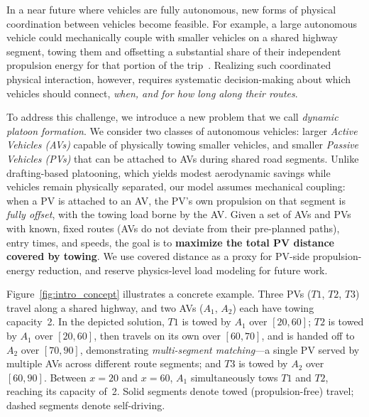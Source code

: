 \documentclass[conference]{IEEEtran}
\begin{document}

In a near future where vehicles are fully autonomous, new forms of physical coordination between vehicles become feasible. For example, a large autonomous vehicle could mechanically couple with smaller vehicles on a shared highway segment, towing them and offsetting a substantial share of their independent propulsion energy for that portion of the trip~\cite{yurtsever2020survey,shladover2009cooperative}. Realizing such coordinated physical interaction, however, requires systematic decision-making about which vehicles should connect, \emph{when, and for how long along their routes}.

To address this challenge, we introduce a new problem that we call \textit{dynamic platoon formation}. We consider two classes of autonomous vehicles: larger \textit{Active Vehicles (AVs)} capable of physically towing smaller vehicles, and smaller \textit{Passive Vehicles (PVs)} that can be attached to AVs during shared road segments. Unlike drafting-based platooning, which yields modest aerodynamic savings while vehicles remain physically separated, our model assumes mechanical coupling: when a PV is attached to an AV, the PV's own propulsion on that segment is \emph{fully offset}, with the towing load borne by the AV. Given a set of AVs and PVs with known, fixed routes (AVs do not deviate from their pre-planned paths), entry times, and speeds, the goal is to \textbf{maximize the total PV distance covered by towing}. We use covered distance as a proxy for PV-side propulsion-energy reduction, and reserve physics-level load modeling for future work.


Figure~\ref{fig:intro_concept} illustrates a concrete example. Three PVs ($T1$, $T2$, $T3$) travel along a shared highway, and two AVs ($A_1$, $A_2$) each have towing capacity~2. In the depicted solution, $T1$ is towed by $A_1$ over $[20,60]$; $T2$ is towed by $A_1$ over $[20,60]$, then travels on its own over $[60,70]$, and is handed off to $A_2$ over $[70,90]$, demonstrating \textit{multi-segment matching}---a single PV served by multiple AVs across different route segments; and $T3$ is towed by $A_2$ over $[60,90]$. Between $x\!=\!20$ and $x\!=\!60$, $A_1$ simultaneously tows $T1$ and $T2$, reaching its capacity of~2. Solid segments denote towed (propulsion-free) travel; dashed segments denote self-driving.
\end{document}
